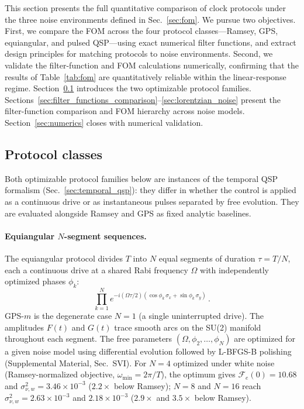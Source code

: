 \documentclass[aps,pra,twocolumn,superscriptaddress,longbibliography]{revtex4-2}
\newcommand{\be}{\begin{equation}}
\newcommand{\ee}{\end{equation}}
\begin{document}
This section presents the full quantitative comparison of clock protocols under
the three noise environments defined in Sec.~\ref{sec:fom}.
We pursue two objectives.
First, we compare the FOM across the four protocol classes---Ramsey, GPS,
equiangular, and pulsed QSP---using exact numerical filter functions, and extract
design principles for matching protocols to noise environments.
Second, we validate the filter-function and FOM calculations numerically,
confirming that the results of Table~\ref{tab:fom} are quantitatively reliable
within the linear-response regime.
Section~\ref{sec:protocol_classes} introduces the two optimizable protocol
families.
Sections~\ref{sec:filter_functions_comparison}--\ref{sec:lorentzian_noise} present
the filter-function comparison and FOM hierarchy across noise models.
Section~\ref{sec:numerics} closes with numerical validation.


\subsection{Protocol classes}
\label{sec:protocol_classes}

Both optimizable protocol families below are instances of the temporal QSP
formalism (Sec.~\ref{sec:temporal_qsp}): they differ in whether the control is applied
as a continuous drive or as instantaneous pulses separated by free evolution.
They are evaluated alongside Ramsey and GPS as fixed analytic baselines.

\paragraph{Equiangular $N$-segment sequences.}
The equiangular protocol divides $T$ into $N$ equal segments of duration
$\tau = T/N$, each a continuous drive at a shared Rabi frequency $\Omega$ with
independently optimized phases $\phi_k$:
\be
  \prod_{k=1}^{N}
    e^{-i(\Omega\tau/2)(\cos\phi_k\,\sigma_x + \sin\phi_k\,\sigma_y)}\,.
  \label{eq:eq_seq}
\ee
GPS-$m$ is the degenerate case $N=1$ (a single uninterrupted drive).
The amplitudes $F(t)$ and $G(t)$ trace smooth arcs on the SU(2) manifold
throughout each segment.
The free parameters $(\Omega,\phi_2,\ldots,\phi_N)$ are optimized for a given
noise model using differential evolution followed by L-BFGS-B polishing
(Supplemental Material, Sec.~SVI).
For $N=4$ optimized under white noise (Ramsey-normalized objective,
$\omega_{\min}=2\pi/T$), the optimum gives
$\mathcal{F}_e(0)=10.68$ and $\sigma^2_{\nu,w}=3.46\times10^{-3}$ ($2.2\times$
below Ramsey); $N=8$ and $N=16$ reach $\sigma^2_{\nu,w}=2.63\times10^{-3}$
and $2.18\times10^{-3}$ ($2.9\times$ and $3.5\times$ below Ramsey).
\end{document}
